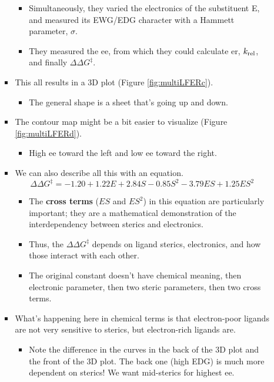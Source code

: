 \documentclass[../notes.tex]{subfiles}
\begin{document}
\begin{itemize}
\begin{itemize}
\begin{itemize}
\begin{itemize}
                \item Simultaneously, they varied the electronics of the substituent E, and measured its EWG/EDG character with a Hammett parameter, $\sigma$.
                \item They measured the ee, from which they could calculate er, $k_\textup{rel}$, and finally $\Delta\Delta G^\ddagger$.
            \end{itemize}
            \item This all results in a 3D plot (Figure \ref{fig:multiLFERc}).
            \begin{itemize}
                \item The general shape is a sheet that's going up and down.
            \end{itemize}
            \item The contour map might be a bit easier to visualize (Figure \ref{fig:multiLFERd}).
            \begin{itemize}
                \item High ee toward the left and low ee toward the right.
            \end{itemize}
            \item We can also describe all this with an equation.
            \begin{equation*}
                \Delta\Delta G^\ddagger = -1.20+1.22E+2.84S-0.85S^2-3.79ES+1.25ES^2
            \end{equation*}
            \begin{itemize}
                \item The \textbf{cross terms} ($ES$ and $ES^2$) in this equation are particularly important; they are a mathematical demonstration of the interdependency between sterics and electronics.
                \item Thus, the $\Delta\Delta G^\ddagger$ depends on ligand sterics, electronics, and how those interact with each other.
                \item The original constant doesn't have chemical meaning, then electronic parameter, then two steric parameters, then two cross terms.
            \end{itemize}
            \item What's happening here in chemical terms is that electron-poor ligands are not very sensitive to sterics, but electron-rich ligands are.
            \begin{itemize}
                \item Note the difference in the curves in the back of the 3D plot and the front of the 3D plot. The back one (high EDG) is much more dependent on sterics! We want mid-sterics for highest ee.

\end{itemize}
\end{itemize}
\end{itemize}
\end{itemize}
\end{document}
